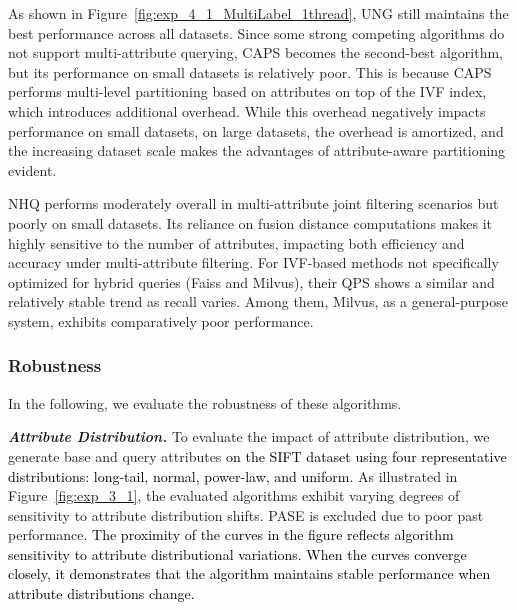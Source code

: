 \documentclass[sigconf, nonacm, pdfa]{acmart}
\begin{document}
{	As shown in Figure~\ref{fig:exp_4_1_MultiLabel_1thread}, UNG still maintains the best performance across all datasets. Since some strong competing algorithms do not support multi-attribute querying, CAPS becomes the second-best algorithm, but its performance on small datasets is relatively poor. This is because CAPS performs multi-level partitioning based on attributes on top of the IVF index, which introduces additional overhead. While this overhead negatively impacts performance on small datasets, on large datasets, the overhead is amortized, and the increasing dataset scale makes the advantages of attribute-aware partitioning evident.
	
	NHQ performs moderately overall in multi-attribute joint filtering scenarios but poorly on small datasets. Its reliance on fusion distance computations makes it highly sensitive to the number of attributes, impacting both efficiency and accuracy under multi-attribute filtering.
	For IVF-based methods not specifically optimized for hybrid queries (Faiss and Milvus), their QPS shows a similar and relatively stable trend as recall varies. Among them, Milvus, as a general-purpose system, exhibits comparatively poor performance.
	
	
	
	
	
	\subsubsection{Robustness}In the following, we evaluate the robustness of these algorithms.
	
	\textit{\textbf{Attribute Distribution.}} To evaluate the impact of attribute distribution, we generate base and query attributes \textcolor{black}{on the SIFT dataset using four representative distributions: long-tail, normal, power-law, and uniform.}
	As illustrated in Figure~\ref{fig:exp_3_1}, the evaluated algorithms exhibit varying degrees of sensitivity to attribute distribution shifts. PASE is excluded due to poor past performance. \textcolor{black}{The proximity of the curves in the figure reflects algorithm sensitivity to attribute distributional variations. When the curves converge closely, it demonstrates that the algorithm maintains stable performance when attribute distributions change.} 


}
\end{document}
